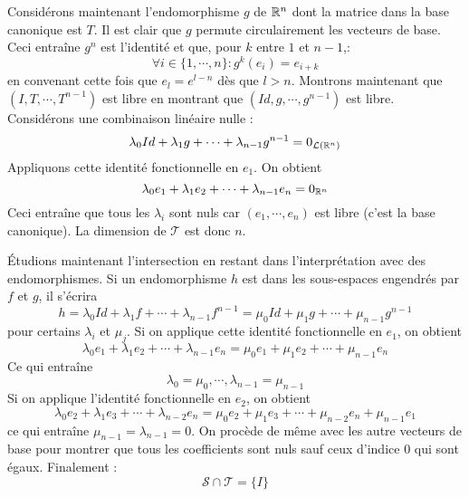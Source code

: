 \begin{enumerate}
Considérons maintenant l'endomorphisme $g$ de $\mathbb{R}^n$ dont la matrice dans la base canonique est $T$. Il est clair que $g$ permute circulairement les vecteurs de base. Ceci entraîne $g^n$ est l'identité et que, pour $k$ entre $1$ et $n-1$,:
\begin{displaymath}
 \forall i\in\{1,\cdots,n\} : g^k(e_i)=e_{i+k}
\end{displaymath}
en convenant cette fois que $e_l=e^{l-n}$ dès que $l>n$.\newline
Montrons maintenant que $(I,T,\cdots,T^{n-1})$ est libre en montrant que $(Id,g,\cdots,g^{n-1})$ est libre.\newline
Considérons une combinaison linéaire nulle :
\begin{displaymath}
 \lambda_0Id+\lambda_1g+\cdots +\lambda_{n-1}g^{n-1}= 0_{\mathcal L(\mathbb{R}^n)}
\end{displaymath}
Appliquons cette identité fonctionnelle en $e_1$. On obtient
\begin{displaymath}
 \lambda_0e_1+\lambda_1e_2+\cdots +\lambda_{n-1}e_{n}= 0_{\mathbb{R}^n}
\end{displaymath}
Ceci entraîne que tous les $\lambda_i$ sont nuls car $(e_1,\cdots,e_n)$ est libre (c'est la base canonique). La dimension de $\mathcal T$ est donc $n$.

\'Etudions maintenant l'intersection en restant dans l'interprétation avec des endomorphismes. Si un endomorphisme $h$ est dans les sous-espaces engendrés par $f$ et $g$, il s'écrira 
\begin{displaymath}
 h= \lambda_0Id+\lambda_1f+\cdots +\lambda_{n-1}f^{n-1}=
\mu_0Id+\mu_1g+\cdots +\mu_{n-1}g^{n-1}
\end{displaymath}
pour certains $\lambda_i$ et $\mu_j$. Si on applique cette identité fonctionnelle en $e_1$, on obtient
\begin{displaymath}
 \lambda_0e_1+\lambda_1e_2+\cdots +\lambda_{n-1}e_{n}= 
 \mu_0e_1+\mu_1e_2+\cdots +\mu_{n-1}e_{n}
\end{displaymath}
Ce qui entraîne 
\begin{displaymath}
 \lambda_0=\mu_0,\cdots,\lambda_{n-1}=\mu_{n-1}
\end{displaymath}
Si on applique l'identité fonctionnelle en $e_2$, on obtient
\begin{displaymath}
 \lambda_0e_2+\lambda_1e_3+\cdots +\lambda_{n-2}e_{n}= 
 \mu_0e_2+\mu_1e_3+\cdots +\mu_{n-2}e_{n}+\mu_{n-1}e_{1}
\end{displaymath}
ce qui entraîne $\mu_{n-1}=\lambda_{n-1}=0$. On procède de même avec les autre vecteurs de base pour montrer que tous les coefficients sont nuls sauf ceux d'indice $0$ qui sont égaux. Finalement :
\begin{displaymath}
 \mathcal S \cap \mathcal T = \{I\}
\end{displaymath}


\end{enumerate}
